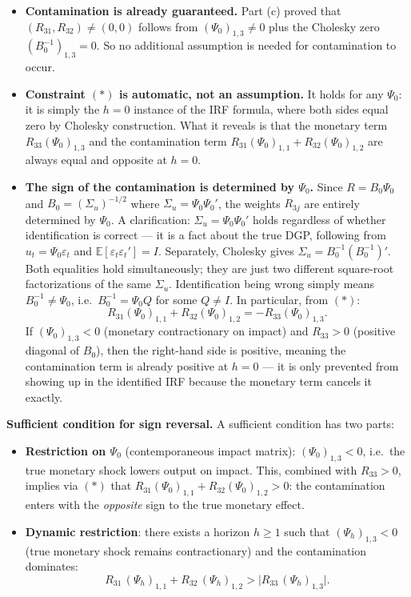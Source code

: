 \documentclass[12pt]{article}
\newcommand{\E}{\mathbb E}
\theoremstyle{definition}
\begin{document}
\begin{itemize}
  \item \textbf{Contamination is already guaranteed.} Part (c) proved that $(R_{31},R_{32})\neq(0,0)$ follows from $(\Psi_0)_{1,3}\neq 0$ plus the Cholesky zero $(B_0^{-1})_{1,3}=0$. So no additional assumption is needed for contamination to occur.

  \item \textbf{Constraint $(*)$ is automatic, not an assumption.} It holds for any $\Psi_0$: it is simply the $h=0$ instance of the IRF formula, where both sides equal zero by Cholesky construction. What it reveals is that the monetary term $R_{33}(\Psi_0)_{1,3}$ and the contamination term $R_{31}(\Psi_0)_{1,1}+R_{32}(\Psi_0)_{1,2}$ are always equal and opposite at $h=0$.

  \item \textbf{The sign of the contamination is determined by $\Psi_0$.} Since $R = B_0\Psi_0$ and $B_0 = (\Sigma_u)^{-1/2}$ where $\Sigma_u = \Psi_0\Psi_0'$, the weights $R_{3j}$ are entirely determined by $\Psi_0$. A clarification: $\Sigma_u = \Psi_0\Psi_0'$ holds regardless of whether identification is correct --- it is a fact about the true DGP, following from $u_t=\Psi_0\varepsilon_t$ and $\E[\varepsilon_t\varepsilon_t']=I$. Separately, Cholesky gives $\Sigma_u = B_0^{-1}(B_0^{-1})'$. Both equalities hold simultaneously; they are just two different square-root factorizations of the same $\Sigma_u$. Identification being wrong simply means $B_0^{-1}\neq\Psi_0$, i.e.\ $B_0^{-1}=\Psi_0 Q$ for some $Q\neq I$. In particular, from $(*)$:
  \[
  R_{31}(\Psi_0)_{1,1} + R_{32}(\Psi_0)_{1,2} = -R_{33}(\Psi_0)_{1,3}.
  \]
  If $(\Psi_0)_{1,3}<0$ (monetary contractionary on impact) and $R_{33}>0$ (positive diagonal of $B_0$), then the right-hand side is positive, meaning the contamination term is already positive at $h=0$ --- it is only prevented from showing up in the identified IRF because the monetary term cancels it exactly.
\end{itemize}

\noindent\textbf{Sufficient condition for sign reversal.} A sufficient condition has two parts:
\begin{itemize}
  \item \textbf{Restriction on $\Psi_0$} (contemporaneous impact matrix): $(\Psi_0)_{1,3}<0$, i.e.\ the true monetary shock lowers output on impact. This, combined with $R_{33}>0$, implies via $(*)$ that $R_{31}(\Psi_0)_{1,1}+R_{32}(\Psi_0)_{1,2}>0$: the contamination enters with the \emph{opposite} sign to the true monetary effect.

  \item \textbf{Dynamic restriction}: there exists a horizon $h\geq 1$ such that $(\Psi_h)_{1,3}<0$ (true monetary shock remains contractionary) and the contamination dominates:
  \[
  R_{31}\,(\Psi_h)_{1,1} + R_{32}\,(\Psi_h)_{1,2} > \bigl|R_{33}\,(\Psi_h)_{1,3}\bigr|.
  \]
\end{itemize}
\end{document}
